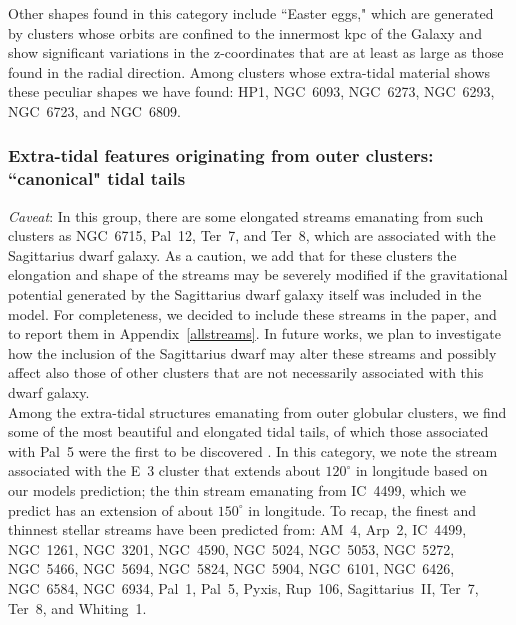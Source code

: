             Other shapes found in this category include ``Easter eggs," which are generated by clusters whose orbits are confined to the innermost kpc of the Galaxy and show significant variations in the z-coordinates that are at least as large as those found in the radial direction. Among clusters whose extra-tidal material shows these peculiar shapes we have found: HP1, NGC~6093, NGC~6273, NGC~6293, NGC~6723, and NGC~6809.

        \subsubsection{Extra-tidal features originating from outer clusters: ``canonical" tidal tails}

            \textit{Caveat}: In this group, there are some elongated streams emanating from such clusters as NGC~6715, Pal~12, Ter~7, and Ter~8, which are  associated with the Sagittarius dwarf galaxy. As a caution, we add that for these clusters the elongation and shape of the streams may be severely modified if the gravitational potential generated by the Sagittarius dwarf galaxy itself was included in the model. For completeness, we decided to include these streams in the paper, and to report them in Appendix~\ref{allstreams}. In future works, we plan to investigate how the inclusion of the Sagittarius dwarf may alter these streams and possibly affect also those of other clusters that are not necessarily associated with this dwarf galaxy.\\

            Among the extra-tidal structures emanating from outer globular clusters, we find some of the most beautiful and elongated tidal tails, of which those associated with Pal~5 were the first to be discovered \citep{2001ApJ...548L.165O}.  In this category, we note the stream associated with the E~3 cluster that extends about  $120^\circ$  in longitude based on our models prediction; the thin stream emanating from IC~4499, which we predict has an extension of about $150^\circ$ in longitude.  To recap, the finest and thinnest stellar streams have been predicted from: AM~4, Arp~2, IC~4499, NGC~1261, NGC~3201, NGC~4590, NGC~5024, NGC~5053, NGC~5272, NGC~5466, NGC~5694, NGC~5824, NGC~5904, NGC~6101, NGC~6426, NGC~6584, NGC~6934, Pal~1, Pal~5, Pyxis, Rup~106, Sagittarius~II, Ter~7, Ter~8, and Whiting~1.

